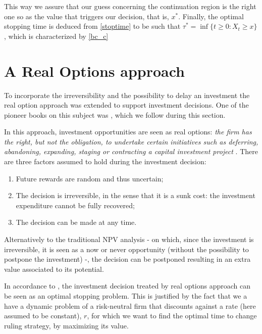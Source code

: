 This way we assure that our guess concerning the continuation region is the right one so as the value that triggers our decision, that is, $x^*$. Finally, the optimal stopping time is deduced from \eqref{stoptime} to be such that $\tau^*= \inf \{ t \geq 0: X_t \geq x \}$, which is characterized by \eqref{bc_c}




\section{A Real Options approach}
\label{bc_ro}


To incorporate the irreversibility and the possibility to delay an investment the real option approach was extended to support investment decisions. One of the pioneer books on this subject was \cite{dixit:book}, which we follow during this section.

In this approach, investment opportunities are seen as real options: \textit{the firm has the right, but not the obligation, to undertake certain initiatives such as deferring, abandoning, expanding, staging or contracting a capital investment project} \cite{corp:book}. There are three factors assumed to hold during the investment decision:
\begin{enumerate}
	\item Future rewards are random and thus uncertain;
	\item The decision is irreversible, in the sense that it is a sunk cost: the investment expenditure cannot be fully recovered;
	\item The decision can be made at any time.
\end{enumerate}


Alternatively to the traditional NPV analysis - on which, since the investment is irreversible, it is seen as a now or never opportunity (without the possibility to postpone the investment) -, the decision can be postponed resulting in an extra value associated to its potential. 

In accordance to \cite{dixit:book}, the investment decision treated by real options approach can be seen as an optimal stopping problem. This is justified by the fact that we a have a dynamic problem of a risk-neutral firm that discounts against a rate (here assumed to be constant), $r$, for which we want to find the optimal time to change ruling strategy, by maximizing its value.


